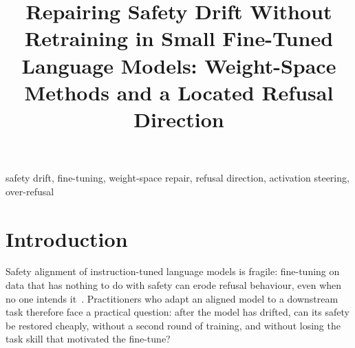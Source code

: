 \documentclass[conference]{IEEEtran}
\begin{document}
\title{Repairing Safety Drift Without Retraining in Small Fine-Tuned Language Models: Weight-Space Methods and a Located Refusal Direction}

\author{
}

\maketitle

\begin{abstract}

\end{abstract}

\begin{IEEEkeywords}
safety drift, fine-tuning, weight-space repair, refusal direction, activation steering, over-refusal
\end{IEEEkeywords}

\section{Introduction}
Safety alignment of instruction-tuned language models is fragile: fine-tuning on data that has nothing to do with safety can erode refusal behaviour, even when no one intends it~\cite{qi2023finetuning}. Practitioners who adapt an aligned model to a downstream task therefore face a practical question: after the model has drifted, can its safety be restored cheaply, without a second round of training, and without losing the task skill that motivated the fine-tune?
\end{document}
